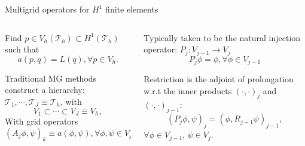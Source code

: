 \documentclass[9pt]{beamer}
\begin{document}
\begin{frame}[c]{Multigrid operators for $H^1$ finite elements}
	\begin{columns}
	\begin{column}{0.5\textwidth}
		\begin{tcolorbox}[colback=blue!5!white,colframe=mDarkTeal,title=$H^1$ (elliptic) problem]
			Find $p \in V_h(\mathcal{T}_h)
			\subset H^1(\mathcal{T}_h)$ such that
			\begin{equation*}
			a(p, q) = L(q), \forall p \in V_h.
			\end{equation*}
		\end{tcolorbox}
	Traditional MG methods construct a
	hierarchy: $\mathcal{T}_{1}, \cdots,
	\mathcal{T}_J \equiv \mathcal{T}_h$, with
	\begin{equation*}
		V_{1} \subset \cdots \subset V_J \equiv V_h,
	\end{equation*}
	With grid operators
	\begin{equation*}
		\left(A_j \phi, \psi\right)_k \equiv
		a(\phi, \psi), \forall\phi,\psi \in V_{j},
	\end{equation*}
	\end{column}
	\begin{column}{0.5\textwidth}
		\begin{tcolorbox}[title=Prolongation]
			Typically taken to be the natural injection
			operator: $P_{j}: V_{j-1} \rightarrow V_{j}$
			\begin{equation*}
				P_j \phi = \phi, \forall \phi \in V_{j-1}
			\end{equation*}
		\end{tcolorbox}
			\begin{tcolorbox}[colback=blue!5!white,colframe=mDarkTeal,title=Restriction]
				Restriction is the adjoint of prolongation
				w.r.t the inner products $(\cdot, \cdot)_j$ and
				$(\cdot, \cdot)_{j-1}$:
		\begin{equation*}
		(P_{j}\phi, \psi)_{j} = (\phi, R_{j-1}\psi)_{j-1},
		\end{equation*}
		$\forall \phi \in V_{j-1}$, $\psi \in V_j$.
	\end{tcolorbox}
	\end{column}
\end{columns}
\end{frame}
\end{document}
